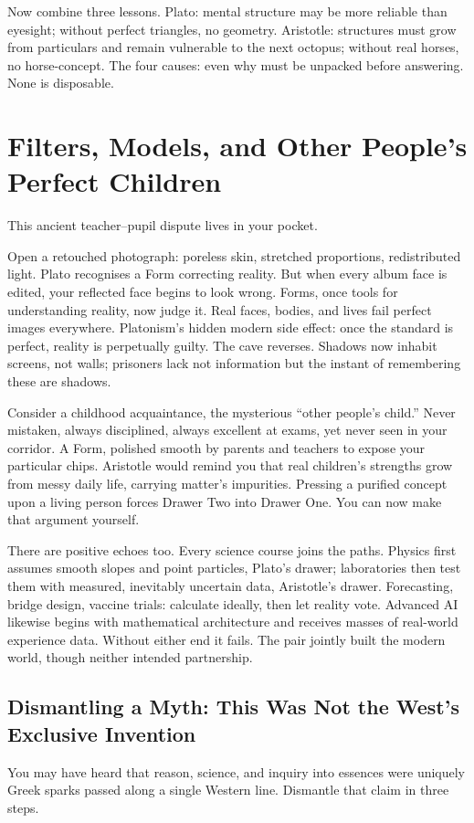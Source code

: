 Now combine three lessons. Plato: mental structure may be more reliable than eyesight; without perfect triangles, no geometry. Aristotle: structures must grow from particulars and remain vulnerable to the next octopus; without real horses, no horse-concept. The four causes: even why must be unpacked before answering. None is disposable.

\section[Filters, Models, and Perfect Children]{Filters, Models, and Other People's Perfect Children}
This ancient teacher--pupil dispute lives in your pocket.

Open a retouched photograph: poreless skin, stretched proportions, redistributed light. Plato recognises a Form correcting reality. But when every album face is edited, your reflected face begins to look wrong. Forms, once tools for understanding reality, now judge it. Real faces, bodies, and lives fail perfect images everywhere. Platonism's hidden modern side effect: once the standard is perfect, reality is perpetually guilty. The cave reverses. Shadows now inhabit screens, not walls; prisoners lack not information but the instant of remembering these are shadows.

Consider a childhood acquaintance, the mysterious ``other people's child.'' Never mistaken, always disciplined, always excellent at exams, yet never seen in your corridor. A Form, polished smooth by parents and teachers to expose your particular chips. Aristotle would remind you that real children's strengths grow from messy daily life, carrying matter's impurities. Pressing a purified concept upon a living person forces Drawer Two into Drawer One. You can now make that argument yourself.

There are positive echoes too. Every science course joins the paths. Physics first assumes smooth slopes and point particles, Plato's drawer; laboratories then test them with measured, inevitably uncertain data, Aristotle's drawer. Forecasting, bridge design, vaccine trials: calculate ideally, then let reality vote. Advanced AI likewise begins with mathematical architecture and receives masses of real-world experience data. Without either end it fails. The pair jointly built the modern world, though neither intended partnership.

\subsection[Not a Uniquely Western Invention]{Dismantling a Myth: This Was Not the West's Exclusive Invention}
You may have heard that reason, science, and inquiry into essences were uniquely Greek sparks passed along a single Western line. Dismantle that claim in three steps.

